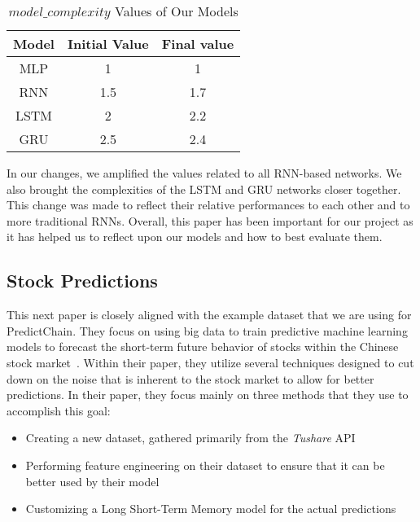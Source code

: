 \documentclass{article}
\begin{document}
    \begin{table}[h!]
        \begin{center}
            \caption{$model\_complexity$ Values of Our Models}
            \label{tab:modelComplexity}
            \begin{tabular}{c|c|c}
                \textbf{Model} & \textbf{Initial Value} & \textbf{Final value}\\
                \hline
                MLP & 1 & 1\\
                RNN & 1.5 & 1.7\\
                LSTM & 2 & 2.2\\
                GRU & 2.5 & 2.4
            \end{tabular}
        \end{center}
    \end{table}

    In our changes, we amplified the values related to all RNN-based networks.  We also brought the complexities
    of the LSTM and GRU networks closer together.  This change was made to reflect their relative performances to
    each other and to more traditional RNNs.  Overall, this paper has been important for our project as it has
    helped us to reflect upon our models and how to best evaluate them.

    \subsection{Stock Predictions}

    This next paper is closely aligned with the example dataset that we are using for PredictChain.  They focus on
    using big data to train predictive machine learning models to forecast the short-term future behavior of stocks
    within the Chinese stock market~\cite{deepPrediction}.  Within their paper, they utilize several techniques designed
    to cut down on the noise that is inherent to the stock market to allow for better predictions.  In their paper,
    they focus mainly on three methods that they use to accomplish this goal:

    \begin{itemize}
        \item Creating a new dataset, gathered primarily from the \textit{Tushare} API
        \item Performing feature engineering on their dataset to ensure that it can be better used by their model
        \item Customizing a Long Short-Term Memory model for the actual predictions
    \end{itemize}
\end{document}
